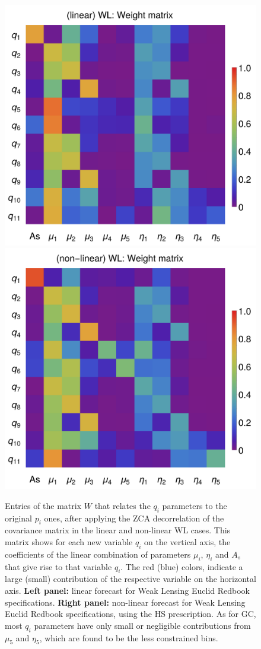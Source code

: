 \begin{figure}[htbp]
	\centering{}\includegraphics[width=0.47\linewidth]{Chapters/linear-nonlinear-MG-forecasts/figures/Decorrelations-WL/Weight_Matrix_ZCA_SquareNorm--_fiducialMGBin3_Euclid_WL_linearPK_}
	\includegraphics[width=0.47\linewidth]{Chapters/linear-nonlinear-MG-forecasts/figures/Decorrelations-WL/Weight_Matrix_ZCA_SquareNorm--_fiducialMGBin3_Euclid_WL_nonlinearPk__Zhao_}
	\caption[Weight matrix for ZCA decorrelation in a Euclid WL case.]{
Entries of the matrix $W$ that relates the $q_i$ parameters to the original $p_i$ ones, after applying the ZCA decorrelation of the covariance matrix in the linear and non-linear WL cases. This matrix shows for each new variable $q_i$ on the vertical axis, the coefficients of the linear combination of parameters $\mu_i$, $\eta_i$ and $A_s$ that give rise to that variable $q_i$. The red (blue) colors, indicate a large (small) contribution of the respective variable on the horizontal axis. \textbf{Left panel:} linear forecast for Weak Lensing Euclid Redbook specifications.
\textbf{Right panel:} non-linear forecast for Weak Lensing Euclid Redbook specifications, using the HS prescription.
As for GC, most $q_i$ parameters have only small or negligible contributions from $\mu_5$  and $\eta_5$, which are found to be the less constrained bins.
	\label{fig:Wmat-ZCA-WL}}
\end{figure}

